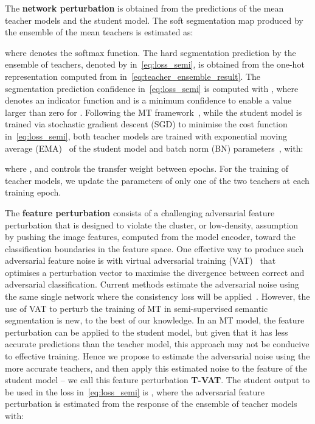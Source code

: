 \documentclass[10pt,twocolumn,letterpaper]{article}
\begin{document}
The \textbf{network perturbation} 
is obtained from the  predictions of the mean teacher models and the student model. 
The soft segmentation map produced by the ensemble of the mean teachers is estimated as:

where  denotes the softmax function. The hard segmentation prediction by the ensemble of teachers, denoted by  in~\eqref{eq:loss_semi}, is obtained from the one-hot representation computed from  in~\eqref{eq:teacher_ensemble_result}.
The segmentation prediction confidence  in~\eqref{eq:loss_semi} is computed with , where  denotes an indicator function and  is a minimum confidence to enable a value larger than zero for .
Following the MT framework~\cite{tarvainen2017mean}, while the student model is trained via stochastic gradient descent (SGD) to minimise the cost function in~\eqref{eq:loss_semi}, both teacher models are trained with exponential moving average (EMA)~\cite{tarvainen2017mean} of the student model and batch norm (BN) parameters~\cite{cai2021exponential}, with:

where , and  controls the transfer weight between epochs.  
For the training of teacher models, we update the parameters of only one of the two teachers at each training epoch. 



The \textbf{feature perturbation} 
consists of a challenging adversarial feature perturbation that is designed to violate the cluster, or low-density, assumption~\cite{ouali2020semi,van2020survey} by pushing the image features, computed from the model encoder, toward the classification boundaries in the feature space. 
One effective way to produce such adversarial feature noise is with virtual adversarial training (VAT)~\cite{miyato2018virtual} that optimises a perturbation vector to maximise the divergence between correct and adversarial classification.
Current methods  
estimate the adversarial noise using 
the same single network where the consistency loss will be applied~\cite{ouali2020semi}.
However, the use of VAT to perturb the training of MT in semi-supervised semantic segmentation is new, to the best of our knowledge.
In an MT model, the feature perturbation can be applied to the student model,
but given that it has less accurate predictions than the teacher model, this approach may not be conducive to effective training. 
Hence we propose to estimate the adversarial noise using the more accurate teachers, and then apply this estimated noise to the feature of the student model -- we call this feature perturbation \textbf{T-VAT}.
The student output to be used in the loss in~\eqref{eq:loss_semi} is , where 
the adversarial feature perturbation  is estimated from the response of the ensemble of teacher models with:
\end{document}
